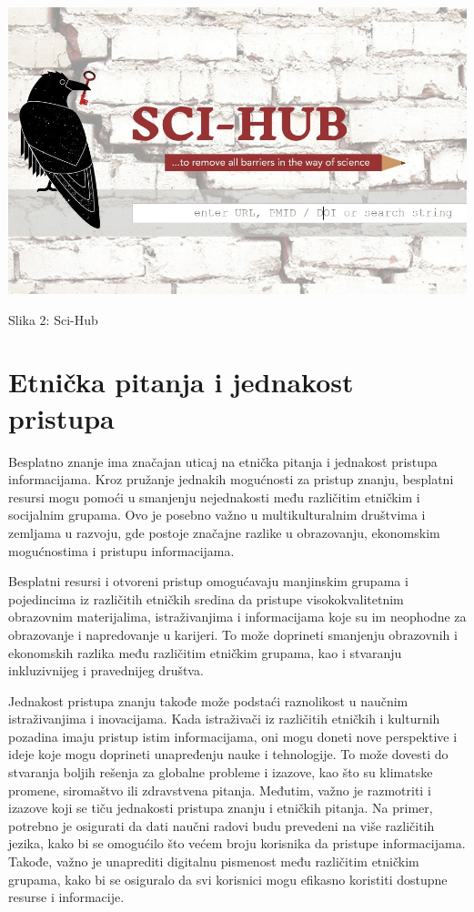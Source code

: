 \documentclass[a4paper]{article}
\begin{document}
{\begin{center}
\includegraphics[scale=0.3]{scihub.jpg}
\end{center}
\caption{Slika 2: Sci-Hub}
\label{sci-hub}


\setlength{\parskip}{1em}


\section{Etnička pitanja i jednakost pristupa}
\label{Etnička pitanja i jednakost pristupa}


Besplatno znanje ima značajan uticaj na etnička pitanja i jednakost pristupa informacijama. Kroz pružanje jednakih mogućnosti za pristup znanju, besplatni resursi mogu pomoći u smanjenju nejednakosti među različitim etničkim i socijalnim grupama. Ovo je posebno važno u multikulturalnim društvima i zemljama u razvoju, gde postoje značajne razlike u obrazovanju, ekonomskim mogućnostima i pristupu informacijama.

Besplatni resursi i otvoreni pristup omogućavaju manjinskim grupama i pojedincima iz različitih etničkih sredina da pristupe visokokvalitetnim obrazovnim materijalima, istraživanjima i informacijama koje su im neophodne za obrazovanje i napredovanje u karijeri. To može doprineti smanjenju obrazovnih i ekonomskih razlika među različitim etničkim grupama, kao i stvaranju inkluzivnijeg i pravednijeg društva.

Jednakost pristupa znanju takođe može podstaći raznolikost u naučnim istraživanjima i inovacijama. Kada istraživači iz različitih etničkih i kulturnih pozadina imaju pristup istim informacijama, oni mogu doneti nove perspektive i ideje koje mogu doprineti unapređenju nauke i tehnologije. To može dovesti do stvaranja boljih rešenja za globalne probleme i izazove, kao što su klimatske promene, siromaštvo ili zdravstvena pitanja.
Međutim, važno je razmotriti i izazove koji se tiču jednakosti pristupa znanju i etničkih pitanja. Na primer, potrebno je osigurati da dati naučni radovi budu prevedeni na više različitih jezika, kako bi se omogućilo što većem broju korisnika da pristupe informacijama. Takođe, važno je unaprediti digitalnu pismenost među različitim etničkim grupama, kako bi se osiguralo da svi korisnici mogu efikasno koristiti dostupne resurse i informacije.


}
\end{document}
